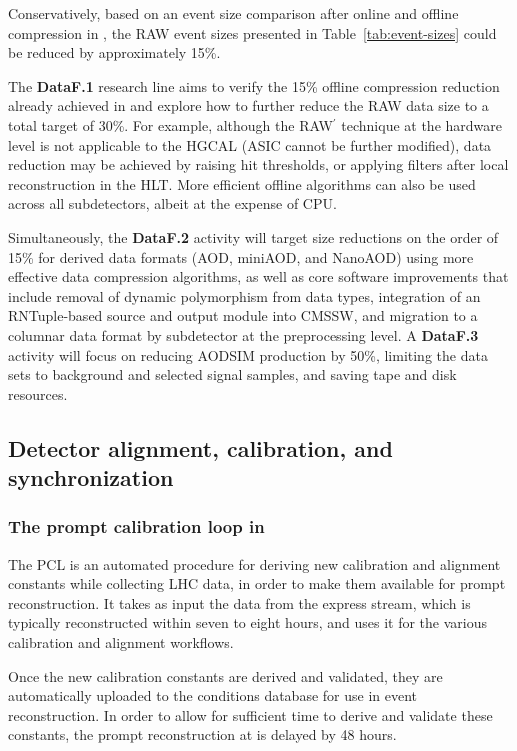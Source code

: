Conservatively, based on an event size comparison after online and offline compression in \RunThree, the \gls{RAW} event sizes presented in Table~\ref{tab:event-sizes} could be reduced by approximately 15\%.

The \textbf{DataF.1} research line aims to verify the 15\% offline compression reduction already achieved in \RunThree and explore how to further reduce the \gls{RAW} data size to a total target of 30\%. For example, although the \gls{RAW}$^\prime$ technique at the hardware level is not applicable to the \gls{HGCAL} (ASIC cannot be further modified), data reduction may be achieved by raising hit thresholds, or applying filters after local reconstruction in the HLT. More efficient offline algorithms can also be used across all subdetectors, albeit at the expense of \gls{CPU}. 

Simultaneously, the \textbf{DataF.2} activity will target size reductions on the order of 15\% for derived data formats (\gls{AOD}, miniAOD, and NanoAOD) using more effective data compression algorithms, as well as core software improvements that include removal of dynamic polymorphism from data types, integration of an RNTuple-based source and output module into \gls{CMSSW}, and migration to a columnar data format by subdetector at the preprocessing level.
A \textbf{DataF.3} activity will focus on reducing AODSIM production by 50\%, limiting the data sets to background and selected signal samples, and saving tape and disk resources.

\subsection{Detector alignment, calibration, and synchronization}
\label{sec:pcl}

\subsubsection{The prompt calibration loop in \RunThree}

The \gls{PCL} is an automated procedure for deriving new calibration and alignment constants while collecting LHC data, in order to make them available for prompt reconstruction. It takes as input the data from the express stream, which is typically reconstructed within seven to eight hours, and uses it for the various calibration and alignment workflows. 

Once the new calibration constants are derived and validated, they are automatically uploaded to the conditions database for use in event reconstruction. In order to allow for sufficient time to derive and validate these constants, the prompt reconstruction at \TierZero is delayed by 48 hours.

